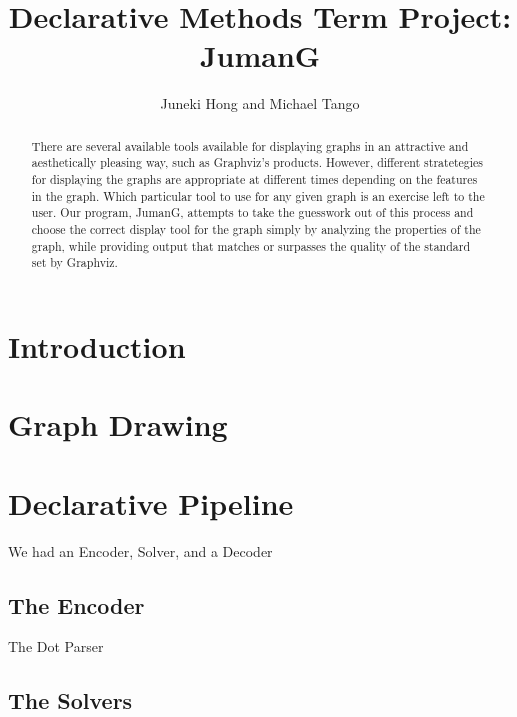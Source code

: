 \documentclass{article}
\title{Declarative Methods Term Project: \\ JumanG}
\author{Juneki Hong and Michael Tango}
\date{}
\begin{document}
\maketitle

\begin{abstract}
There are several available tools available for displaying graphs in an attractive and aesthetically pleasing way, such as Graphviz's products. 
However, different stratetegies for displaying the graphs are appropriate at different times depending on the features in the graph. Which 
particular tool to use for any given graph is an exercise left to the user. Our program, JumanG, attempts to take the guesswork out of 
this process and choose the correct display tool for the graph simply by analyzing the properties of the graph, while providing output that 
matches or surpasses the quality of the standard set by Graphviz.
\end{abstract}

\section{Introduction}

\section{Graph Drawing}


\section{Declarative Pipeline}

We had an Encoder, Solver, and a Decoder

\subsection{The Encoder}
The Dot Parser

\subsection{The Solvers}
\end{document}
